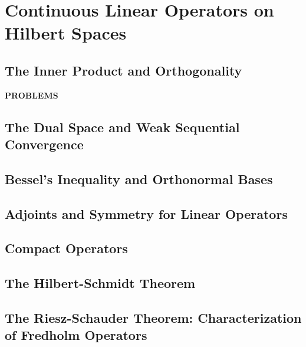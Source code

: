 \chapter{Continuous Linear Operators on Hilbert Spaces}

\section{The Inner Product and Orthogonality}
\begin{center}
	\textbf{PROBLEMS}
\end{center}
\begin{enumerate}
	\setcounter{enumi}{0}
\end{enumerate}

\section{The Dual Space and Weak Sequential Convergence}

\section{Bessel's Inequality and Orthonormal Bases}

\section{Adjoints and Symmetry for Linear Operators}

\section{Compact Operators}

\section{The Hilbert-Schmidt Theorem}

\section{The Riesz-Schauder Theorem: Characterization of Fredholm Operators}
